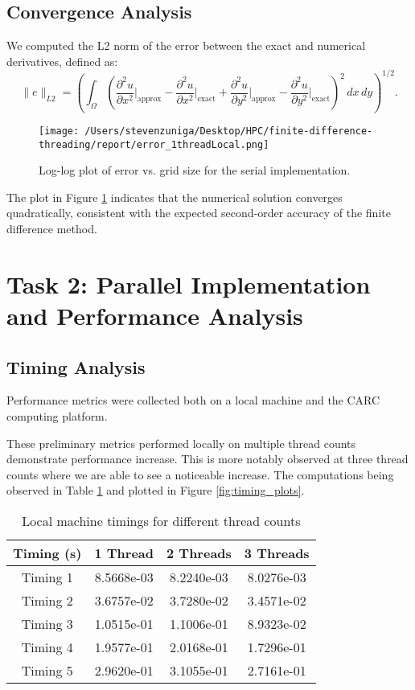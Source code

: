 \documentclass[12pt]{article}
\begin{document}
\subsection{Convergence Analysis}
We computed the L2 norm of the error between the exact and numerical derivatives, defined as:
\[
\|e\|_{L2} = \left( \int_{\Omega} \left(\frac{\partial^2 u}{\partial x^2} \Big|_{\text{approx}} - \frac{\partial^2 u}{\partial x^2} \Big|_{\text{exact}} + \frac{\partial^2 u}{\partial y^2} \Big|_{\text{approx}} - \frac{\partial^2 u}{\partial y^2} \Big|_{\text{exact}} \right)^2 \, dx \, dy \right)^{1/2}.
\]



\begin{figure}[h!]
\centering
\texttt{[image: /Users/stevenzuniga/Desktop/HPC/finite-difference-threading/report/error\_1threadLocal.png]}
\caption{Log-log plot of error vs. grid size for the serial implementation.}
\label{fig:error_serial}
\end{figure}
\FloatBarrier


The plot in Figure \ref{fig:error_serial} indicates that the numerical solution converges quadratically, consistent with the expected second-order accuracy of the finite difference method.



\FloatBarrier

\section{Task 2: Parallel Implementation and Performance Analysis}


\subsection{Timing Analysis}
Performance metrics were collected both on a local machine and the CARC computing platform.

These preliminary metrics performed locally on multiple thread counts demonstrate performance increase. This is more notably observed at three thread counts where we are able to see a noticeable increase.
The computations being observed in Table \ref{tab:local_timings} and plotted in Figure \ref{fig:timing_plots}.

\begin{table}[h!]
\centering
\begin{tabular}{|c|c|c|c|}
\hline
	Timing (s) & 	1 Thread & 	2 Threads & 	3 Threads \\ \hline
	Timing 1 & 8.5668e-03 & 8.2240e-03 & 8.0276e-03 \\ \hline
	Timing 2 & 3.6757e-02 & 3.7280e-02 & 3.4571e-02 \\ \hline
	Timing 3 & 1.0515e-01 & 1.1006e-01 & 8.9323e-02 \\ \hline
	Timing 4 & 1.9577e-01 & 2.0168e-01 & 1.7296e-01 \\ \hline
	Timing 5 & 2.9620e-01 & 3.1055e-01 & 2.7161e-01 \\ \hline
\end{tabular}
\caption{Local machine timings for different thread counts}
\label{tab:local_timings}
\end{table}
\end{document}
